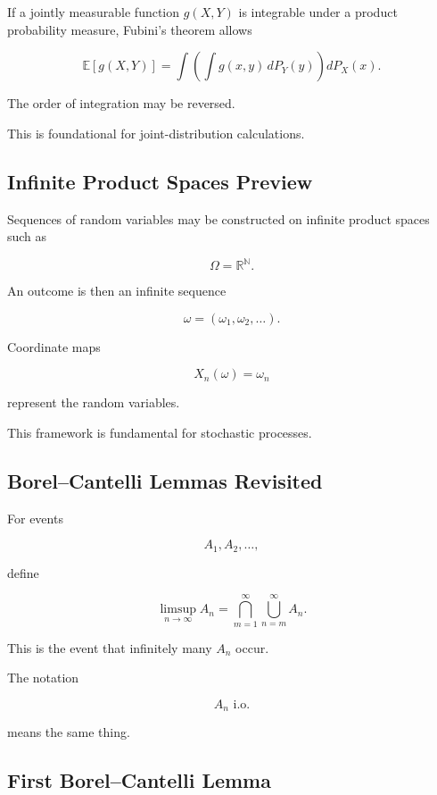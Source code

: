 If a jointly measurable function \(g(X,Y)\) is integrable under a
product probability measure, Fubini's theorem allows

\[
\boxed{
\mathbb{E}[g(X,Y)]
=
\int
\left(
\int
g(x,y)\,dP_Y(y)
\right)
dP_X(x).
}
\]

The order of integration may be reversed.

This is foundational for joint-distribution calculations.

\subsection{Infinite Product Spaces Preview}
\label{subsec:infinite-product-spaces-preview}

Sequences of random variables may be constructed on infinite product
spaces such as

\[
\Omega
=
\mathbb{R}^{\mathbb{N}}.
\]

An outcome is then an infinite sequence

\[
\omega
=
(\omega_1,\omega_2,\ldots).
\]

Coordinate maps

\[
X_n(\omega)
=
\omega_n
\]

represent the random variables.

This framework is fundamental for stochastic processes.

\subsection{Borel--Cantelli Lemmas Revisited}
\label{subsec:borel-cantelli-measure}

For events

\[
A_1,A_2,\ldots,
\]

define

\[
\boxed{
\limsup_{n\to\infty}A_n
=
\bigcap_{m=1}^{\infty}
\bigcup_{n=m}^{\infty}A_n.
}
\]

This is the event that infinitely many \(A_n\) occur.

The notation

\[
A_n\text{ i.o.}
\]

means the same thing.

\subsection{First Borel--Cantelli Lemma}
\label{subsec:first-borel-cantelli-measure}

